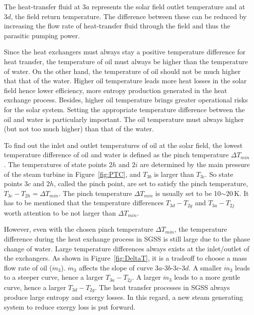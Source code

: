 The heat-transfer fluid at $3a$ represents the solar field outlet temperature and at $3d$, the field return temperature. The difference between these can be reduced by increasing the flow rate of heat-transfer fluid through the field and thus the parasitic pumping power.

Since the heat exchangers must always stay a positive temperature difference for heat transfer, the temperature of oil must always be higher than the temperature of water. On the other hand, the temperature of oil should not be much higher that that of the water. Higher oil temperature leads more heat losses in the solar field hence lower efficiency, more entropy production generated in the heat exchange process. Besides, higher oil temperature brings greater operational risks for the solar system. Setting the appropriate temperature difference between the oil and water is particularly important. The oil temperature must always higher (but not too much higher) than that of the water.

To find out the inlet and outlet temperatures of oil at the solar field, the lowest temperature difference of oil and water is defined as the pinch temperature $\Delta T_{min}$. The temperatures of state points $2h$ and $2i$ are determined by the main pressure of the steam turbine in Figure~\ref{fig:PTC}, and $T_{3b}$ is larger than $T_{3c}$. So state points $3c$ and $2h$, called the pinch point, are set to satisfy the pinch temperature, $T_{3c} - T_{2h} = \Delta T_{min}$. The pinch temperature $\Delta T_{min}$ is usually set to be 10$\sim$20$\,\mathrm{K}$.
It has to be mentioned that the temperature differences $T_{3d} - T_{2g}$ and $T_{3a} - T_{2j}$ worth attention to be not larger than $\Delta T_{min}$.

However, even with the chosen pinch temperature $\Delta T_{min}$, the temperature difference during the heat exchange process in SGSS is still large due to the phase change of water. Large temperature differences always exists at the inlet/outlet of the exchangers. As shown in Figure~\ref{fig:DeltaT}, it is a tradeoff to choose a mass flow rate of oil ($\dot{m}_3$). $\dot{m}_3$ affects the slope of curve $3a$-$3b$-$3c$-$3d$. A smaller $\dot{m}_3$ leads to a steeper curve, hence a larger $T_{3a} - T_{2j}$. A larger $\dot{m}_3$ leads to a more gentle curve, hence a larger $T_{3d} - T_{2g}$. The heat transfer processes in SGSS always produce large entropy and exergy losses. In this regard, a new steam generating system to reduce exergy loss is put forward.

